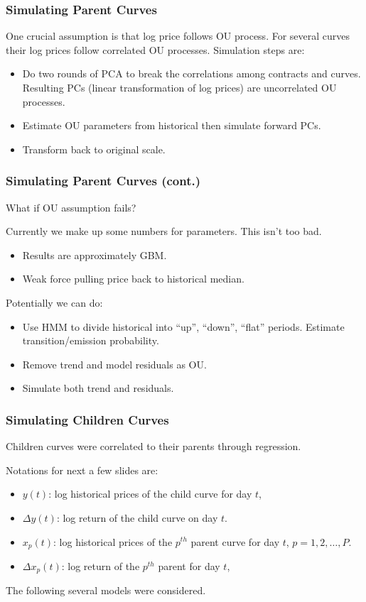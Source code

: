 \documentclass[10pt]{beamer}
\begin{document}
\frame
{
  \frametitle{Simulating Parent Curves}
One crucial assumption is that {\color{red} log price} follows
OU process. For several curves their log prices
follow correlated OU processes. Simulation steps are:
\begin{itemize}
\item Do two rounds of PCA to break the correlations
among contracts and curves. 
Resulting PCs (linear transformation of log prices)
are uncorrelated OU processes.
\item Estimate OU parameters from historical then simulate
forward PCs. 
\item Transform back to original scale.
\end{itemize}
}

\frame
{
  \frametitle{Simulating Parent Curves  (cont.)}
What if OU assumption fails? 

\vspace{10pt}
Currently we make up some numbers for parameters. 
This isn't too bad. 
\begin{itemize}
\item Results are approximately GBM.
\item Weak force pulling price back to historical median.
\end{itemize}

\vspace{10pt}
Potentially we can do:
\begin{itemize}
\item Use HMM to divide historical into ``up'', ``down'', ``flat''
periods. Estimate transition/emission probability.
\item Remove trend and model residuals as OU. 
\item Simulate both trend and residuals.
\end{itemize}
}

\frame
{
  \frametitle{Simulating Children Curves}
Children curves were correlated to their parents through regression.

\vspace{15pt}
Notations for next a few slides are:
\begin{itemize}
\item $y(t)$: log historical prices of the child curve for day $t$, 
\item $\Delta y(t)$: log return of the child curve on day $t$. 
\item $x_p(t)$: log historical prices of the $p^{th}$ parent curve for day $t$, 
$p=1, 2, \ldots, P$.
\item $\Delta x_p(t)$: log return of the $p^{th}$ parent for day $t$, 
\end{itemize}

The following several models were considered. 
}
\end{document}
